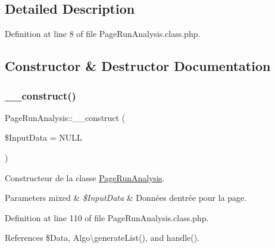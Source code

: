 \subsection{Detailed Description}


Definition at line 8 of file Page\+Run\+Analysis.\+class.\+php.



\subsection{Constructor \& Destructor Documentation}
\mbox{\label{class_page_run_analysis_a55b883af577385e55cb40c5420e0a692}} 
\subsubsection{\texorpdfstring{\+\_\+\+\_\+construct()}{\_\_construct()}\hspace{0.1cm}{\footnotesize\ttfamily [1/2]}}
{\footnotesize\ttfamily Page\+Run\+Analysis\+::\+\_\+\+\_\+construct (\begin{DoxyParamCaption}\item[{}]{\$\+Input\+Data = {\ttfamily NULL} }\end{DoxyParamCaption})}

Constructeur de la classe \hyperlink{class_page_run_analysis}{Page\+Run\+Analysis}. 
\begin{DoxyParams}[1]{Parameters}
mixed & {\em \$\+Input\+Data} & Données d\textquotesingle{}entrée pour la page. \\
\hline
\end{DoxyParams}


Definition at line 110 of file Page\+Run\+Analysis.\+class.\+php.



References \$\+Data, Algo\textbackslash{}generate\+List(), and handle().

